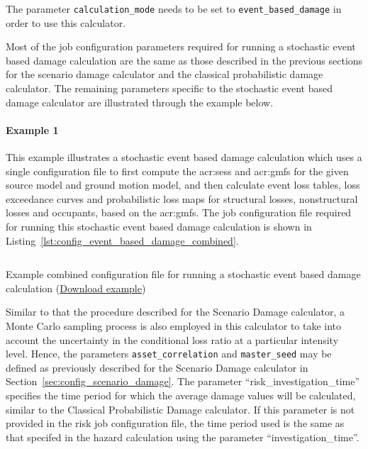 The parameter \Verb+calculation_mode+ needs to be set to
\Verb+event_based_damage+ in order to use this calculator.

Most of the job configuration parameters required for running a stochastic
event based damage calculation are the same as those described in the previous
sections for the scenario damage calculator and the classical probabilistic damage
calculator. The remaining parameters specific to the stochastic event based
damage calculator are illustrated through the example below.


\paragraph{Example 1}

This example illustrates a stochastic event based damage calculation which uses
a single configuration file to first compute the \glspl{acr:ses} and
\glspl{acr:gmf} for the given source model and ground motion model, and then
calculate event loss tables, loss exceedance curves and probabilistic
loss maps for structural losses, nonstructural losses and occupants,
based on the \glspl{acr:gmf}. The job configuration file required for
running this stochastic event based damage calculation is shown in
Listing~\ref{lst:config_event_based_damage_combined}.

\begin{listing}[htbp]
  \inputminted[firstline=1,firstnumber=1,fontsize=\scriptsize
  ,frame=single,bgcolor=lightgray,linenos,label=job.ini]{ini}{oqum/risk/verbatim/config_event_based_damage_combined.ini}
  \caption{Example combined configuration file for running a stochastic event based damage calculation (\href{https://raw.githubusercontent.com/gem/oq-engine/master/doc/manual/oqum/risk/verbatim/config_event_based_damage_combined.ini}{Download example})}
  \label{lst:config_event_based_damage_combined}
\end{listing}

Similar to that the procedure described for the Scenario Damage calculator, a
Monte Carlo sampling process is also employed in this calculator to take into
account the uncertainty in the conditional loss ratio at a particular
intensity level. Hence, the parameters \Verb+asset_correlation+ and
\Verb+master_seed+ may be defined as previously described for the Scenario
Damage calculator in Section~\ref{sec:config_scenario_damage}. The parameter
``risk\_investigation\_time'' specifies the time period for which the average
damage values will be calculated, similar to the
Classical Probabilistic Damage calculator. If this parameter is not provided in
the risk job configuration file, the time period used is the same as that
specifed in the hazard calculation using the parameter ``investigation\_time''.

